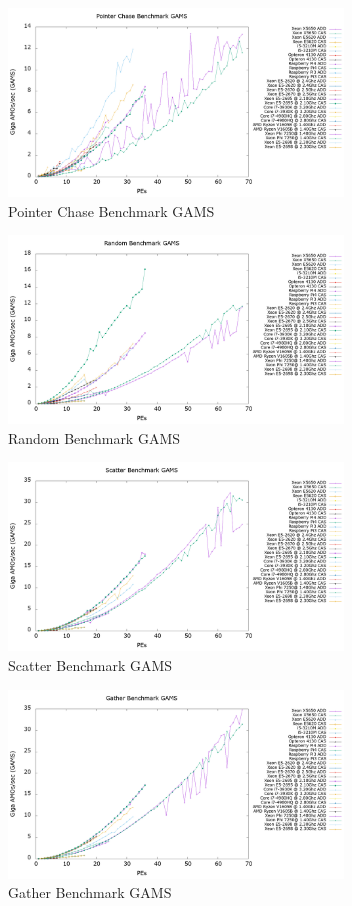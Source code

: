 \begin{figure}[!t]
\centering
\includegraphics[width=3.5in]{figures/PTRCHASE_GAMS.png}
\caption{Pointer Chase Benchmark GAMS}
\label{fig:ptrchase_gams}
\end{figure}

\begin{figure}[!t]
\centering
\includegraphics[width=3.5in]{figures/RAND_GAMS.png}
\caption{Random Benchmark GAMS}
\label{fig:rand_gams}
\end{figure}

\begin{figure}[!t]
\centering
\includegraphics[width=3.5in]{figures/SCATTER_GAMS.png}
\caption{Scatter Benchmark GAMS}
\label{fig:scatter_gams}
\end{figure}

\begin{figure}[!t]
\centering
\includegraphics[width=3.5in]{figures/GATHER_GAMS.png}
\caption{Gather Benchmark GAMS}
\label{fig:gather_gams}
\end{figure}

